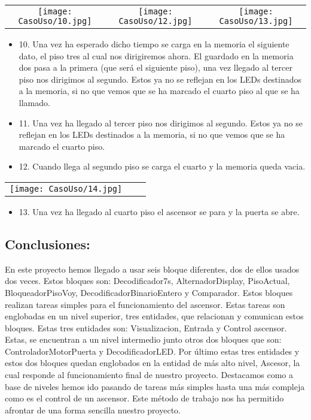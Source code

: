 	\begin{table}[H]
	\centering
	\begin{tabular}{ccc}
		 \texttt{[image: CasoUso/10.jpg]}  &
		 \texttt{[image: CasoUso/12.jpg]}   &
		 \texttt{[image: CasoUso/13.jpg]}  \\ 
	\end{tabular}
	\end{table}
	\begin{itemize}
	    \item 10.  Una vez ha esperado dicho tiempo se carga en la memoria el siguiente dato, el piso tres al cual nos dirigiremos ahora. El guardado en la memoria dos pasa a la primera (que será el siguiente piso), una vez llegado al tercer piso nos dirigimos al segundo. Estos ya no se reflejan en los LEDs destinados a la memoria, si no que vemos que se ha marcado el cuarto piso al que se ha llamado.
	    \item 11.  Una vez ha llegado al tercer piso nos dirigimos al segundo. Estos ya no se reflejan en los LEDs destinados a la memoria, si no que vemos que se ha marcado el cuarto piso.
	    \item 12. Cuando llega al segundo piso se carga el cuarto y la memoria queda vacia.
	\end{itemize}
	
	\begin{table}[H]
	\centering
	\begin{tabular}{ccc}
		 \texttt{[image: CasoUso/14.jpg]}   &  &  \\
	\end{tabular}
	\end{table}
	
	\begin{itemize}
	    \item 13. Una vez ha llegado al cuarto piso el ascensor se para y la puerta se abre.
	\end{itemize}

\subsection{Conclusiones:}
	En este proyecto hemos llegado a usar seis bloque diferentes, dos de ellos usados dos veces. Estos bloques son: Decodificador7s, AlternadorDisplay, PisoActual, BloqueadorPisoVoy, DecodificadorBinarioEntero y Comparador. Estos bloques realizan tareas simples para el funcionamiento del ascensor. Estas tareas son englobadas en un nivel superior, tres entidades, que relacionan y comunican estos bloques. Estas tres entidades son: Visualizacion, Entrada y Control ascensor. Estas, se encuentran a un nivel intermedio junto otros dos bloques que son: ControladorMotorPuerta y DecodificadorLED. 
Por último estas tres entidades y estos dos bloques quedan englobados en la entidad de más alto nivel, Ascesor, la cual responde al funcionamiento final de nuestro proyecto. Destacamos como a base de niveles hemos ido pasando de tareas más simples hasta una más compleja como es el control de un ascensor. Este método de trabajo nos ha permitido afrontar de una forma sencilla nuestro proyecto.
